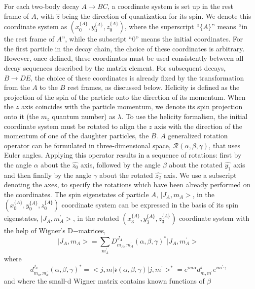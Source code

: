 For each two-body decay $A\to B C$, 
a coordinate system is set up in the rest frame of $A$,
with $\hat{z}$ being the direction of quantization for its spin. 
We denote this coordinate system as $(x_{0}^{\{A\}}, y_{0}^{\{A\}}, z_{0}^{\{A\}})$, 
where the superscript “$\{A\}$” means “in the rest frame of $A$”, 
while the subscript “$0$” means the initial coordinates. 
For the first particle in the decay chain, 
the choice of these coordinates is arbitrary. 
However, 
once defined, 
these coordinates must be used consistently between all decay sequences described by the matrix element.
For subsequent decays, 
\eg $B\to D E$, 
the choice of these coordinates is already fixed by the transformation from the $A$ to the $B$ rest frames, 
as discussed below. 
Helicity is defined as the projection of the spin of the particle onto the direction of its momentum. 
When the $z$ axis coincides with the particle momentum, 
we denote its spin projection onto it (\ie the $m_{z}$ quantum number) as $\lambda$. 
To use the helicity formalism, 
the initial coordinate system must be rotated to align the $z$ axis with the direction of the momentum of one of the daughter particles, 
\eg the $B$. 
$A$ generalized rotation operator can be formulated in three-dimensional space,
$\mathscr{R}(\alpha,\beta,\gamma)$,
that uses Euler angles. 
Applying this operator results in a sequence of rotations: 
first by the angle $\alpha$ about the $\hat{z_{0}}$ axis, 
followed by the angle $\beta$ about the rotated $\hat{y_{1}}$ axis and then finally by the angle $\gamma$ about the rotated $\hat{z_{2}}$ axis. 
We use a subscript denoting the axes, 
to specify the rotations which have been already performed on the coordinates. 
The spin eigenstates of particle $A$, 
$|J_{A},m_{A}>$, 
in the $(x_{0}^{\{A\}}, y_{0}^{\{A\}}, z_{0}^{\{A\}})$ coordinate system can be expressed in the basis of its spin eigenstates, 
$|J_{A},m_{A}^{'}>$, 
in the rotated $(x_{3}^{\{A\}}, y_{3}^{\{A\}}, z_{3}^{\{A\}})$ coordinate system with the help of Wigner’s D−matrices,
\begin{equation}
   |J_{A},m_{A}> = \sum_{m_{A}^{'}} { D^{J_{A}}_{m_{A},m^{'}_{A}} (\alpha,\beta,\gamma)^{*} |J_{A},m_{A}^{'}> }
\end{equation}
where
\begin{equation}
   d^{j_{a}}_{m_{a},m^{'}_{a}} (\alpha,\beta,\gamma)^{*} 
   = <j,m| \mathscr{r}(\alpha,\beta,\gamma) | j,m^{'}>^{*} 
   = e^{i m \alpha} d^{j}_{m,m^{'}} e^{i m^{'} \gamma}
\end{equation}
and where the small-d Wigner matrix contains known functions of $\beta$ 
